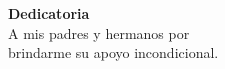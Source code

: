 \begin{titlepage}

\begin{flushright}
    {\Large \textbf{Dedicatoria}}\\[1cm]
    A mis padres y hermanos por\\ brindarme su apoyo incondicional. \\
\end{flushright}

\end{titlepage}